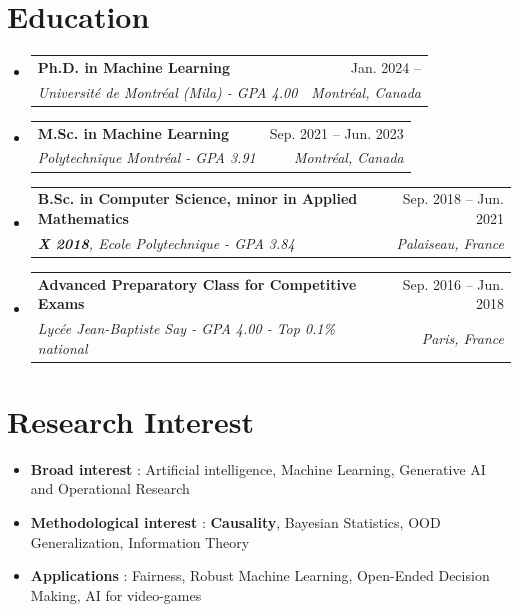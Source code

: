 \documentclass[letterpaper,11pt]{article}
\makeatletter
\newcommand{\resumeSubheading}[4]{
  \vspace{-2pt}\item
    \begin{tabular*}{0.97\textwidth}[t]{l@{\extracolsep{\fill}}r}
      \textbf{#1} & #2 \\
      \textit{\small#3} & \textit{\small #4} \\
    \end{tabular*}\vspace{-7pt}
}
\newcommand{\resumeSubHeadingListStart}{\begin{itemize}[leftmargin=0.15in, label={}]}
\newcommand{\resumeSubHeadingListEnd}{\end{itemize}}
\makeatother
\begin{document}
\section{Education}
  \resumeSubHeadingListStart
        \resumeSubheading
      {Ph.D. in Machine Learning}{Jan. 2024 -- }
      {Université de Montréal (Mila) - GPA 4.00}{Montréal, Canada}
      \vspace{.2pt}
      \resumeSubheading
      {M.Sc. in Machine Learning}{Sep. 2021 -- Jun. 2023}
      {Polytechnique Montréal - GPA 3.91}{Montréal, Canada}
      \vspace{.2pt}
    \resumeSubheading
      {B.Sc. in Computer Science, minor in Applied Mathematics}{Sep. 2018 -- Jun. 2021}
      {\textbf{X 2018}, Ecole Polytechnique - GPA 3.84}{Palaiseau, France}
    \resumeSubheading
      {Advanced Preparatory Class for Competitive Exams}{Sep. 2016 -- Jun. 2018}
      {Lycée Jean-Baptiste Say - GPA 4.00 - Top 0.1\% national}{Paris, France}
      
  \resumeSubHeadingListEnd
\section{Research Interest}
        \begin{itemize}
            \item \textbf{Broad interest} : Artificial intelligence, Machine Learning, Generative AI and Operational Research
            \vspace{-5pt}
            \item \textbf{Methodological interest} : \textbf{Causality}, Bayesian Statistics, OOD Generalization, Information Theory
            \vspace{-5pt}
            \item \textbf{Applications} : Fairness, Robust Machine Learning, Open-Ended Decision Making, AI for video-games
        \end{itemize}
\end{document}
